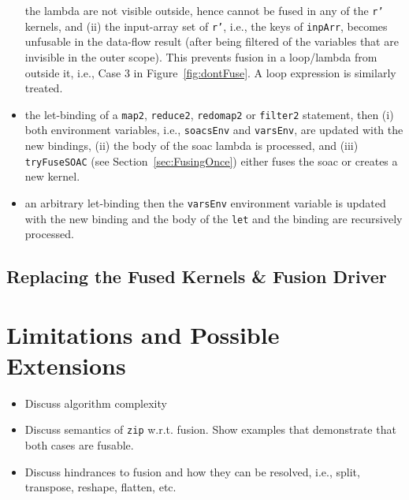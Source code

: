 \documentclass{sigplanconf}  %
\newcommand{\emp}[1]{\textcolor{DikuRed}{ #1}}
\begin{document}
\begin{itemize}
                the lambda are not visible outside, hence cannot be fused in any of the
                {\tt r'} kernels, and (ii) the input-array set of {\tt r'}, i.e., the keys of 
                {\tt inpArr}, becomes unfusable in the data-flow result 
                (after being filtered of the variables that are invisible in the outer scope). 
            This prevents fusion in a loop/lambda from outside it, i.e., 
                \emp{Case 3} in Figure~\ref{fig:dontFuse}.
          A loop expression is similarly treated. 
    \item  the let-binding of a {\tt map2}, {\tt reduce2}, {\tt redomap2} or {\tt filter2} 
            statement, then (i) both environment variables, i.e., {\tt soacsEnv} and {\tt varsEnv}, 
            are updated with the new bindings, (ii) the body of the {\sc soac} 
            lambda is processed, and (iii) {\tt tryFuseSOAC} 
            (see Section~\ref{sec:FusingOnce}) either fuses the {\sc soac} 
            or creates a new kernel. 
    \item an arbitrary let-binding then the {\tt varsEnv} environment variable is
            updated with the new binding and the body of the {\tt let} and the
            binding are recursively processed.
            
             
             
\end{itemize}

\subsection{Replacing the Fused Kernels \& Fusion Driver}
\label{sec:fwdPass}


\section{Limitations and Possible Extensions}
\label{sec:Discuss}

\begin{itemize}
    \item Discuss algorithm complexity
    \item Discuss semantics of {\tt zip} w.r.t. fusion. Show examples that
            demonstrate that both cases are fusable.
    \item Discuss hindrances to fusion and how they can be resolved,
            i.e., split, transpose, reshape, flatten, etc. 
\end{itemize}
\end{document}
